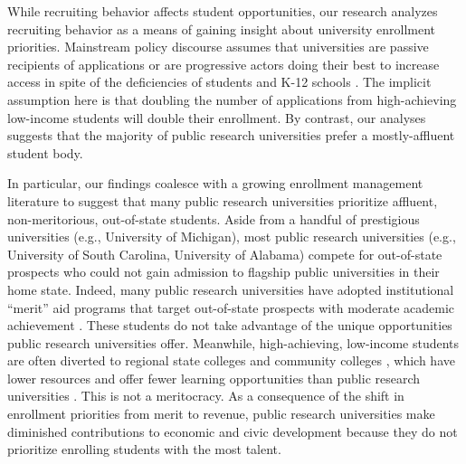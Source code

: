 \documentclass[twoside]{article}
\begin{document}
While recruiting behavior affects student opportunities, our research analyzes recruiting behavior as a means of gaining insight about university enrollment priorities.  Mainstream policy discourse assumes that universities are passive recipients of applications or are progressive actors doing their best to increase access in spite of the deficiencies of students and K-12 schools \citep{RN4016, RN4017}.  The implicit assumption here is that doubling the number of applications from high-achieving low-income students will double their enrollment. By contrast, our analyses suggests that the majority of public research universities prefer a mostly-affluent student body.

In particular, our findings coalesce with a growing enrollment management literature \citep[e.g., ][]{RN3685,RN3528,RN4409,RN4032} to suggest that many public research universities prioritize affluent, non-meritorious, out-of-state students. Aside from a handful of prestigious universities (e.g., University of Michigan), most public research universities (e.g., University of South Carolina, University of Alabama) compete for out-of-state prospects who could not gain admission to flagship public universities in their home state.  Indeed, many public research universities have adopted institutional ``merit'' aid programs that target out-of-state prospects with moderate academic achievement \citep{RN1469,RN3762,RN4032,RN4409}. These students do not take advantage of the unique opportunities public research universities offer.  Meanwhile, high-achieving, low-income students are often diverted to regional state colleges and community colleges \citep{RN4429}, which have lower resources and offer fewer learning opportunities than public research universities \citep{RN532,RN1545}.  This is not a meritocracy.  As a consequence of the shift in enrollment priorities from merit to revenue, public research universities make diminished contributions to economic and civic development because they do not prioritize enrolling students with the most talent.
\end{document}
